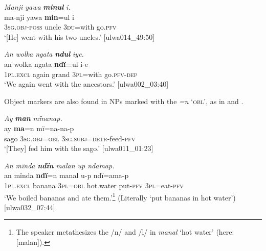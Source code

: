 \ea%
    \label{ex:det:55}
          \textit{Manji yawa} \textbf{\textit{minul}} \textit{i.}\\
\gll    ma-nji      yawa  \textbf{min}=ul    i\\
    3\textsc{sg.obj-poss}  uncle  \textsc{3du}=with   go.\textsc{pfv}\\
\glt `[He] went with his two uncles.’ [ulwa014\_49:50]
\z

\ea%
    \label{ex:det:56}
          \textit{An wolka ngata} \textbf{\textit{ndul}} \textit{iye.}\\
\gll    an      wolka  ngata  \textbf{ndï=}ul    i-e\\
    1\textsc{pl.excl}  again  grand  3\textsc{pl}=with  go.\textsc{pfv-dep}\\
\glt `We again went with the ancestors.’ [ulwa002\_03:40]
\z



Object markers are also found in NPs marked with the  \textit{=n} \textsc{‘obl’}, as in  and .

\ea%
    \label{ex:det:57}
          \textit{Ay} \textbf{\textit{man}} \textit{mïnanap.}\\
\gll    ay    \textbf{ma}=n      mï=na-na-p\\
    sago  3\textsc{sg.obj}=\textsc{obl}  3\textsc{sg.subj}=\textsc{detr}{}-feed-\textsc{pfv}\\
\glt `[They] fed him with the sago.’ [ulwa011\_01:23]
\z

\ea%
    \label{ex:det:58}
          \textit{An mïnda} \textbf{\textit{ndïn}} \textit{malan up ndamap.}\\
\gll    an       mïnda  \textbf{ndï}=n    manal    u-p      ndï=ama-p\\
    1\textsc{pl.excl}  banana  3\textsc{pl=obl}  hot.water  put-\textsc{pfv}  3\textsc{pl}=eat-\textsc{pfv}\\
\glt `We boiled bananas and ate them.’\footnote{The speaker  metathesizes the /n/ and /l/ in \textit{manal} ‘hot water’ (here: [malan]).} (Literally ‘put bananas in hot water’) [ulwa032\_07:44]
\z


